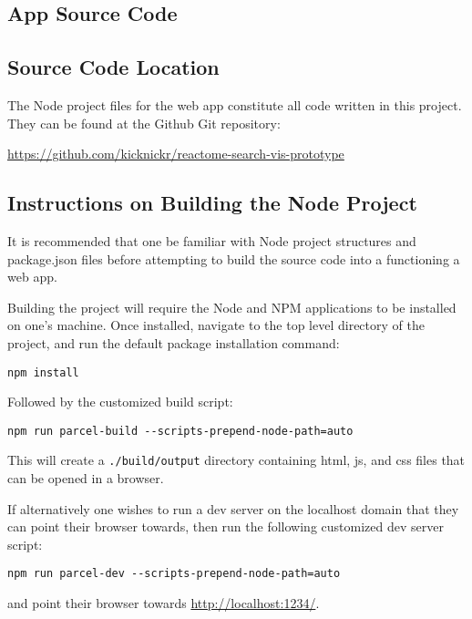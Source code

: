 \documentclass[12pt]{report}
\begin{document}
\begin{appendices}
%

\chapter{App Source Code}
\label{ch:App Source Code}

\section {Source Code Location}
The Node project files for the web app constitute all code written in this project. They can be found at the Github Git repository:

\noindent\url{https://github.com/kicknickr/reactome-search-vis-prototype}
\section{Instructions on Building the Node Project}

It is recommended that one be familiar with Node project structures and package.json files before attempting to build the source code into a functioning a web app.

Building the project will require the Node and NPM applications to be installed on one's machine. Once installed, navigate to the top level directory of the project, and run the default package installation command:
\begin{verbatim}
npm install
\end{verbatim}
Followed by the customized build script:
\begin{verbatim}
npm run parcel-build --scripts-prepend-node-path=auto
\end{verbatim}
This will create a \verb|./build/output| directory containing html, js, and css files that can be opened in a browser. 

If alternatively one wishes to run a dev server on the localhost domain that they can point their browser towards, then run the following customized dev server script:
\begin{verbatim}
npm run parcel-dev --scripts-prepend-node-path=auto
\end{verbatim}
and point their browser towards \url{http://localhost:1234/}.


\end{appendices}
\end{document}
